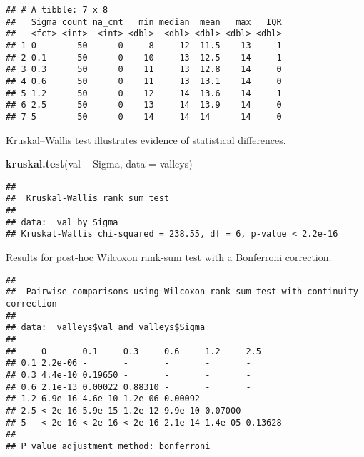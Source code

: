 \documentclass[]{book}
\newenvironment{Shaded}{\begin{snugshade}}{\end{snugshade}}
\newcommand{\DataTypeTok}[1]{\textcolor[rgb]{0.13,0.29,0.53}{#1}}
\newcommand{\KeywordTok}[1]{\textcolor[rgb]{0.13,0.29,0.53}{\textbf{#1}}}
\newcommand{\NormalTok}[1]{#1}
\newcommand{\OperatorTok}[1]{\textcolor[rgb]{0.81,0.36,0.00}{\textbf{#1}}}
\newcommand{\OtherTok}[1]{\textcolor[rgb]{0.56,0.35,0.01}{#1}}
\newcommand{\StringTok}[1]{\textcolor[rgb]{0.31,0.60,0.02}{#1}}
\begin{document}
\begin{verbatim}
## # A tibble: 7 x 8
##   Sigma count na_cnt   min median  mean   max   IQR
##   <fct> <int>  <int> <dbl>  <dbl> <dbl> <dbl> <dbl>
## 1 0        50      0     8     12  11.5    13     1
## 2 0.1      50      0    10     13  12.5    14     1
## 3 0.3      50      0    11     13  12.8    14     0
## 4 0.6      50      0    11     13  13.1    14     0
## 5 1.2      50      0    12     14  13.6    14     1
## 6 2.5      50      0    13     14  13.9    14     0
## 7 5        50      0    14     14  14      14     0
\end{verbatim}

Kruskal--Wallis test illustrates evidence of statistical differences.

\begin{Shaded}
\begin{Highlighting}[]
\KeywordTok{kruskal.test}\NormalTok{(val }\OperatorTok{~}\StringTok{ }\NormalTok{Sigma, }\DataTypeTok{data =}\NormalTok{ valleys)}
\end{Highlighting}
\end{Shaded}

\begin{verbatim}
## 
##  Kruskal-Wallis rank sum test
## 
## data:  val by Sigma
## Kruskal-Wallis chi-squared = 238.55, df = 6, p-value < 2.2e-16
\end{verbatim}

Results for post-hoc Wilcoxon rank-sum test with a Bonferroni correction.

\begin{Shaded}
\end{Shaded}

\begin{verbatim}
## 
##  Pairwise comparisons using Wilcoxon rank sum test with continuity correction 
## 
## data:  valleys$val and valleys$Sigma 
## 
##     0       0.1     0.3     0.6     1.2     2.5    
## 0.1 2.2e-06 -       -       -       -       -      
## 0.3 4.4e-10 0.19650 -       -       -       -      
## 0.6 2.1e-13 0.00022 0.88310 -       -       -      
## 1.2 6.9e-16 4.6e-10 1.2e-06 0.00092 -       -      
## 2.5 < 2e-16 5.9e-15 1.2e-12 9.9e-10 0.07000 -      
## 5   < 2e-16 < 2e-16 < 2e-16 2.1e-14 1.4e-05 0.13628
## 
## P value adjustment method: bonferroni
\end{verbatim}
\end{document}
